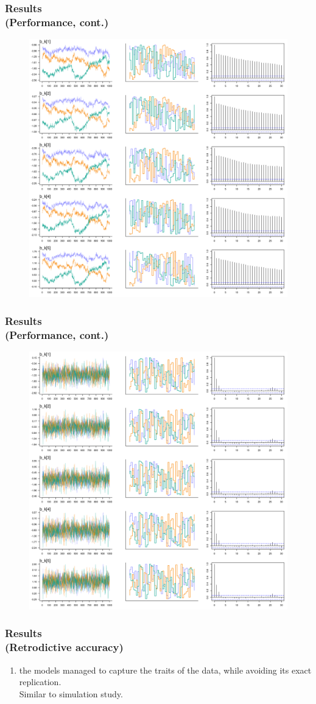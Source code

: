 \documentclass[arial,12pt,xcolor=dvipsnames]{beamer}
\begin{document}
%
\begin{frame}
	\frametitle{Results \\
		(Performance, cont.)}
	\begin{figure}[H]
		\centering
		\includegraphics[width=0.65\linewidth]{FOLV_CE_bk_1_5}
		\label{fig:FOLV_CE_chains1}
	\end{figure} 
\end{frame}
%
\begin{frame}
	\frametitle{Results \\
		(Performance, cont.)}
	\begin{figure}[H]
		\centering
		\includegraphics[width=0.65\linewidth]{FOLV_NC_bk_1_5}
		\label{fig:FOLV_NC_chains1}
	\end{figure} 
\end{frame}
%
\begin{frame}
	\frametitle{Results \\
		(Retrodictive accuracy)}
	\begin{enumerate}
		\item the models managed to capture the traits of the data, while avoiding its exact replication.\\
		\vspace{0.3cm} Similar to simulation study.
	\end{enumerate} 
\end{frame}
\end{document}
